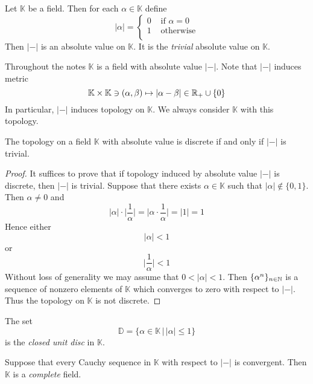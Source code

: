 \documentclass[10pt]{amsart}
\begin{document}
\begin{example}\label{example:trivial_absolute_value}
	Let $\mathbb{K}$ be a field. Then for each $\alpha \in \mathbb{K}$ define
	$$|\alpha| = \begin{cases}
			0 & \mbox{ if }\alpha = 0 \\
			1 & \mbox{ otherwise}     \\
		\end{cases}$$
	Then $|-|$ is an absolute value on $\mathbb{K}$. It is the \textit{trivial} absolute value on $\mathbb{K}$.
\end{example}
\noindent
Throughout the notes $\mathbb{K}$ is a field with absolute value $|-|$. Note that $|-|$ induces metric
$$\mathbb{K}\times \mathbb{K} \ni \left(\alpha, \beta\right) \mapsto |\alpha - \beta|\in {\mathbb R}_+\cup \{0\}$$
In particular, $|-|$ induces topology on $\mathbb{K}$. We always consider $\mathbb{K}$ with this topology.

\begin{fact}\label{fact:trivial_absolute_value_is_the_same_as_discrete_topology}
	The topology on a field $\mathbb{K}$ with absolute value is discrete if and only if $|-|$ is trivial.
\end{fact}
\begin{proof}
	It suffices to prove that if topology induced by absolute value $|-|$ is discrete, then $|-|$ is trivial. Suppose that there exists $\alpha \in \mathbb{K}$ such that $|\alpha| \not \in \{0,1\}$. Then $\alpha \neq 0$ and
	$$|\alpha|\cdot \bigg|\frac{1}{\alpha}\bigg| = \bigg|\alpha \cdot \frac{1}{\alpha}\bigg| = |1| = 1$$
	Hence either
	$$|\alpha| < 1$$
	or
	$$\bigg|\frac{1}{\alpha}\bigg| < 1$$
	Without loss of generality we may assume that $0 < |\alpha| < 1$. Then $\{\alpha^n\}_{n\in {\mathbb N}}$ is a sequence of nonzero elements of $\mathbb{K}$ which converges to zero with respect to $|-|$. Thus the topology on $\mathbb{K}$ is not discrete.
\end{proof}

\begin{definition}
	The set
	$$\mathbb{D} = \big\{\alpha \in \mathbb{K}\,\big|\,|\alpha| \leq 1\big\}$$
	is the \textit{closed unit disc} in $\mathbb{K}$.
\end{definition}

\begin{definition}
	Suppose that every Cauchy sequence in $\mathbb{K}$ with respect to $|-|$ is convergent. Then $\mathbb{K}$ is a \textit{complete} field.
\end{definition}
\end{document}
